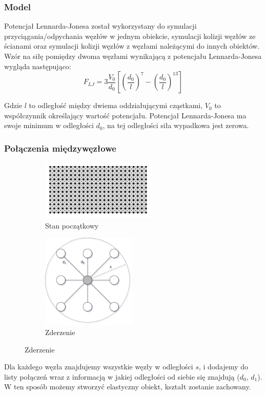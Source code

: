 \documentclass{beamer}
\begin{document}
\begin{frame}
    \frametitle{Model}
    Potencjał Lennarda-Jonesa został wykorzystany do symulacji przyciągania/odpychania węzłów w jednym obiekcie,
    symulacji kolizji węzłów ze ścianami oraz symulacji kolizji węzłów z węzłami należącymi
    do innych obiektów. Wzór na siłę pomiędzy dwoma węzłami wynikającą z potencjału Lennarda-Jonesa wygląda następująco:
    \begin{equation}
        F_{LJ} = 3\frac{V_0}{d_0} \left[ \left(\frac{d_0}{l}\right)^{7} - \left(\frac{d_0}{l}\right)^{13} \right]
    \end{equation}

    Gdzie $l$ to odległość między dwiema oddziałującymi cząstkami, $V_0$ to współczynnik określający wartość potencjału.
    Potencjał Lennarda-Jonesa ma swoje minimum w odległości $d_0$, na tej odległości siła wypadkowa jest zerowa.
\end{frame}

\begin{frame}
    \frametitle{Połączenia międzywęzłowe}

    \begin{figure}[h]
        \begin{subfigure}{0.45\textwidth}
            \centering
            \includegraphics[width=5.5cm]{12x24}
            \caption{Stan początkowy}
        \end{subfigure}
        \begin{subfigure}{0.45\textwidth}
            \centering
            \includegraphics[width=4.5cm]{connections.drawio}
            \caption{Zderzenie}
        \end{subfigure}
    \end{figure}

    Dla każdego węzła znajdujemy wszystkie węzły w odległości $s$, i dodajemy do listy połączeń wraz z informacją
    w jakiej odległości od siebie się znajdują ($d_0$, $d_1$). W ten sposób możemy stworzyć elastyczny obiekt, kształt
    zostanie zachowany.
\end{frame}
\end{document}
